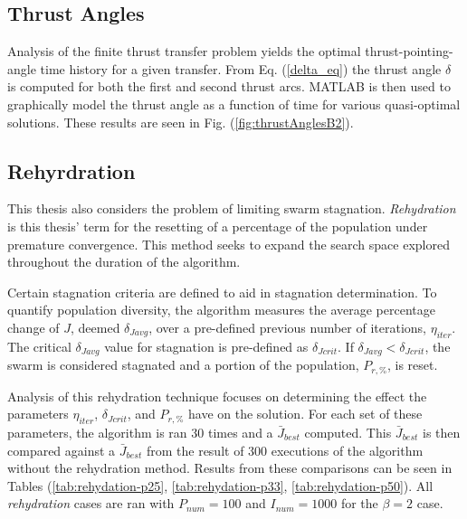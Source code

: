 \subsection{Thrust Angles}

\noindent Analysis of the finite thrust transfer problem yields the optimal thrust-pointing-angle time history for a given transfer. 
From Eq. (\ref{delta_eq}) the thrust angle $\delta$ is computed for both the first and second thrust arcs. MATLAB is then used
to graphically model the thrust angle as a function of time for various quasi-optimal solutions. These results are seen in 
Fig. (\ref{fig:thrustAnglesB2}). \newline

\subsection{Rehyrdration}

\noindent This thesis also considers the problem of limiting swarm stagnation.
\textit{Rehydration} is this thesis' term for the resetting of a percentage of the population under premature convergence.
This method seeks to expand the search space explored throughout the duration of the algorithm. \newline

\noindent Certain stagnation criteria are defined to aid in stagnation determination. To quantify population diversity, the algorithm measures the average
percentage change of $J$, deemed $\delta_{Javg}$, over a pre-defined previous number of iterations, $\eta_{iter}$. The critical 
$\delta_{Javg}$ value for stagnation is pre-defined as $\delta_{Jcrit}$.  If $\delta_{Javg} < \delta_{Jcrit}$, the swarm is considered
stagnated and a portion of the population, $P_{r,\text{\%}}$, is reset. \newline

\noindent Analysis of this rehydration technique focuses on determining the effect the parameters $\eta_{iter}$, $\delta_{Jcrit}$,
and $P_{r,\text{\%}}$ have on the solution. For each set of these parameters, the algorithm is ran 30 times and a $\bar{J}_{best}$
computed. This $\bar{J}_{best}$ is then compared against a $\bar{J}_{best}$ from the result of 300 executions of the algorithm without
the rehydration method. Results from these comparisons can be seen in Tables 
(\ref{tab:rehydation-p25}, \ref{tab:rehydation-p33}, \ref{tab:rehydation-p50}).
All \textit{rehydration} cases are ran with $P_{num} = 100$ and $I_{num} = 1000$ for the $\beta=2$ case.



